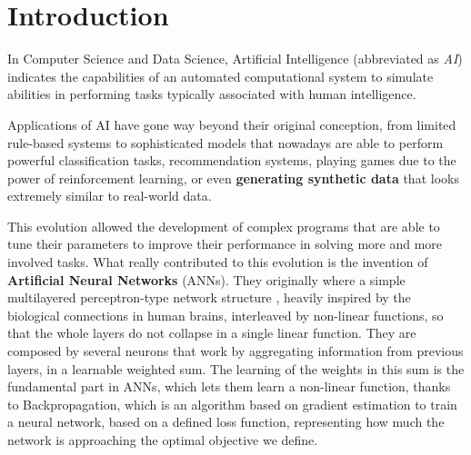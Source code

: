 \documentclass[../thesis.tex]{subfiles}
\begin{document}
\chapter{Introduction}
In Computer Science and Data Science, Artificial Intelligence (abbreviated as \emph{AI}) indicates the capabilities of an automated computational system to simulate abilities in performing tasks typically associated with human intelligence.

Applications of AI have gone way beyond their original conception, from limited rule-based systems to sophisticated models that nowadays are able to perform powerful classification tasks, recommendation systems, playing games due to the power of reinforcement learning, or even \textbf{generating synthetic data} that looks extremely similar to real-world data.

This evolution allowed the development of complex programs that are able to tune their parameters to improve their performance in solving more and more involved tasks.
What really contributed to this evolution is the invention of \textbf{Artificial Neural Networks} (ANNs). They originally where a simple multilayered perceptron-type network structure \citep{polynomial-theory-first-neural-network}, heavily inspired by the biological connections in human brains, interleaved by non-linear functions, so that the whole layers do not collapse in a single linear function.
They are composed by several neurons that work by aggregating information from previous layers, in a learnable weighted sum. The learning of the weights in this sum is the fundamental part in ANNs, which lets them learn a non-linear function, thanks to Backpropagation, which is an algorithm based on gradient estimation to train a neural network, based on a defined loss function, representing how much the network is approaching the optimal objective we define.
\end{document}
